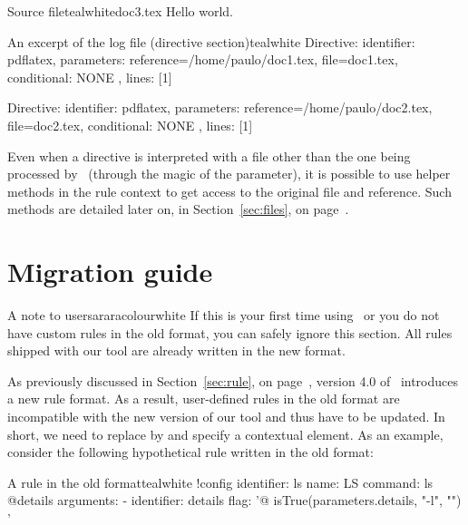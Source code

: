 \begin{ncodebox}{Source file}{teal}{\icnote}{white}{doc3.tex}
Hello world.
\bye
\end{ncodebox}

\begin{codebox}{An excerpt of the log file (directive section)}{teal}{\icnote}{white}
Directive: { identifier: pdflatex, parameters:
{reference=/home/paulo/doc1.tex, file=doc1.tex},
conditional: { NONE }, lines: [1] }

Directive: { identifier: pdflatex, parameters:
{reference=/home/paulo/doc2.tex, file=doc2.tex},
conditional: { NONE }, lines: [1] }
\end{codebox}

Even when a directive is interpreted with a file other than the one being processed by \arara\ (through the magic of the  parameter), it is possible to use helper methods in the rule context to get access to the original file and reference. Such methods are detailed later on, in Section~\ref{sec:files}, on page~\pageref{sec:files}.

\section{Migration guide}
\label{sec:migrationguide}

\begin{messagebox}{A note to users}{araracolour}{\icattention}{white}
If this is your first time using \arara\ or you do not have custom rules in the old format, you can safely ignore this section. All rules shipped with our tool are already written in the new format.
\end{messagebox}

As previously discussed in Section~\ref{sec:rule}, on page~\pageref{sec:rule}, version 4.0 of \arara\ introduces a new rule format. As a result, user-defined rules in the old format are incompatible with the new version of our tool and thus have to be updated. In short, we need to replace  by  and specify a contextual element. As an example, consider the following hypothetical rule  written in the old format:

\begin{codebox}{A rule in the old format}{teal}{\icnote}{white}
!config
identifier: ls
name: LS
command: ls @{details}
arguments:
- identifier: details
  flag: '@{ isTrue(parameters.details, "-l", "") }'
\end{codebox}

